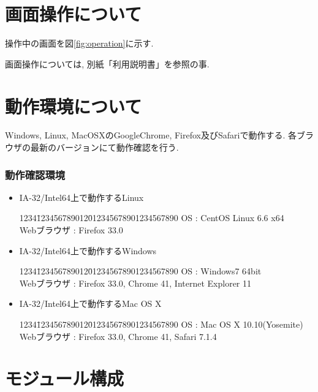 \documentclass[a4paper,10pt,oneside]{jsbook}
\begin{document}
\chapter{画面操作について}

操作中の画面を図\ref{fig:operation}に示す. 

画面操作については, 別紙「利用説明書」を参照の事.


\chapter{動作環境について}
Windows, Linux, MacOSXのGoogleChrome, Firefox及びSafariで動作する.
各ブラウザの最新のバージョンにて動作確認を行う.

\subsection*{動作確認環境}
\begin{itemize}
	\item IA-32/Intel64上で動作するLinux
	\begin{tabbing}
		1234\=123456789012\=012345678901234567890\kill
		\> OS \> : CentOS Linux 6.6 x64 \\ 
		\> Webブラウザ \> : Firefox 33.0
	\end{tabbing}
	\item IA-32/Intel64上で動作するWindows
	\begin{tabbing}
		1234\=123456789012\=012345678901234567890\kill
		\> OS \> : Windows7 64bit \\
		\> Webブラウザ \> : Firefox 33.0, Chrome 41, Internet Explorer 11
	\end{tabbing}
	\item IA-32/Intel64上で動作するMac OS X
	\begin{tabbing}
		1234\=123456789012\=012345678901234567890\kill
		\> OS \> : Mac OS X 10.10(Yosemite)\\
		\> Webブラウザ \> : Firefox 33.0, Chrome 41, Safari 7.1.4
	\end{tabbing}
\end{itemize}

\chapter{モジュール構成}
\end{document}
